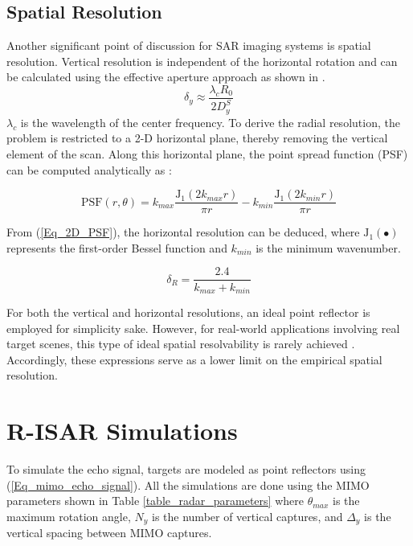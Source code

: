 \documentclass[conference]{IEEEtran}
\begin{document}
		
		\subsection{Spatial Resolution}
		Another significant point of discussion for SAR imaging systems is spatial resolution. Vertical resolution is independent of the horizontal rotation and can be calculated using the effective aperture approach as shown in \cite{Zhuge:ConcealedWeaponDectection}. 
		\begin{equation}
			\delta_y \approx \frac{\lambda_c R_0}{2D_y^S}
		\end{equation}
		$\lambda_c$ is the wavelength of the center frequency. 
		To derive the radial resolution, the problem is restricted to a 2-D horizontal plane, thereby removing the vertical element of the scan. Along this horizontal plane, the point spread function (PSF) can be computed analytically as \cite{Gao:THzWideAngleImaging_containsPSF}:
		
		\begin{equation}
			\label{Eq_2D_PSF}
			\text{PSF}(r,\theta) = k_{max} \frac{\text{J}_1(2k_{max}r)}{\pi r} - k_{min} \frac{\text{J}_1(2k_{min}r)}{\pi r}
		\end{equation}
		
		From (\ref{Eq_2D_PSF}), the horizontal resolution can be deduced, where $\text{J}_1(\bullet)$ represents the first-order Bessel function and $k_{min}$ is the minimum wavenumber. 
		
		\begin{equation}
			\delta_R = \frac{2.4}{k_{max} + k_{min}}
		\end{equation}
		
		For both the vertical and horizontal resolutions, an ideal point reflector is employed for simplicity sake. However, for real-world applications involving real target scenes, this type of ideal spatial resolvability is rarely achieved \cite{Gao:EfficientAlgorithmMIMOCylindrical}. Accordingly, these expressions serve as a lower limit on the empirical spatial resolution.
		
		\section{R-ISAR Simulations}
		\label{sec:simulations}
		
		To simulate the echo signal, targets are modeled as point reflectors using  (\ref{Eq_mimo_echo_signal}). All the simulations are done using the MIMO parameters shown in Table \ref{table_radar_parameters} where $\theta_{max}$ is the maximum rotation angle, $N_y$ is the number of vertical captures, and $\Delta_y$ is the vertical spacing between MIMO captures.
		
\end{document}
